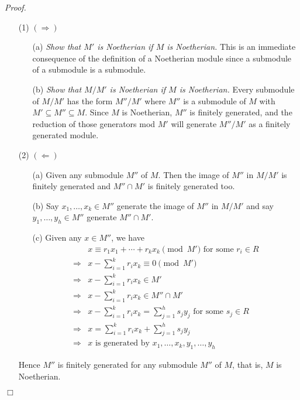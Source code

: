 \documentclass{article}
\begin{document}
\emph{Proof.}
\begin{enumerate}
\item[(1)]
$(\Longrightarrow)$
  \begin{enumerate}
  \item[(a)]
  \emph{Show that $M'$ is Noetherian if $M$ is Noetherian.}
  This is an immediate consequence of the definition of a Noetherian module
  since a submodule of a submodule is a submodule.
  \item[(b)]
  \emph{Show that $M/M'$ is Noetherian if $M$ is Noetherian.}
  Every submodule of $M/M'$ has the form $M''/M'$
  where $M''$ is a submodule of $M$ with $M' \subseteq M'' \subseteq M$.
  Since $M$ is Noetherian, $M''$ is finitely generated,
  and the reduction of those generators mod $M'$ will generate $M''/M'$
  as a finitely generated module.
  \end{enumerate}
\item[(2)]
$(\Longleftarrow)$
  \begin{enumerate}
  \item[(a)]
  Given any submodule $M''$ of $M$.
  Then the image of $M''$ in $M/M'$ is finitely generated and
  $M'' \cap M'$ is finitely generated too.
  \item[(b)]
  Say $x_1, \ldots, x_k \in M''$ generate the image of $M''$ in $M/M'$ and
  say $y_1, \ldots, y_h \in M''$ generate $M'' \cap M'$.
  \item[(c)]
  Given any $x \in M''$, we have
  \begin{align*}
  &x \equiv r_1 x_1 + \cdots + r_k x_k \pmod{M'} \text{ for some } r_i \in R \\
  \Longrightarrow&
  x - \sum_{i=1}^{k} r_i x_k \equiv 0 \pmod{M'} \\
  \Longrightarrow&
  x - \sum_{i=1}^{k} r_i x_k \in M' \\
  \Longrightarrow&
  x - \sum_{i=1}^{k} r_i x_k \in M'' \cap M' \\
  \Longrightarrow&
  x - \sum_{i=1}^{k} r_i x_k = \sum_{j=1}^{h} s_j y_j \text{ for some } s_j \in R \\
  \Longrightarrow&
  x = \sum_{i=1}^{k} r_i x_k + \sum_{j=1}^{h} s_j y_j \\
  \Longrightarrow&
  \text{$x$ is generated by $x_1, \ldots, x_k, y_1, \ldots, y_h$}
  \end{align*}
  \end{enumerate}
  Hence $M''$ is finitely generated for any submodule $M''$ of $M$,
  that is, $M$ is Noetherian.
\end{enumerate}
$\Box$ \\\\



\end{document}
